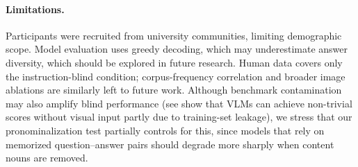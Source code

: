 \paragraph{Limitations.}
Participants were recruited from university communities, limiting demographic scope.
Model evaluation uses greedy decoding, which may underestimate answer diversity, which should be explored in future research.
Human data covers only the instruction-blind condition; corpus-frequency correlation
\citep{mccoy2024embers} and broader image ablations are similarly left to future work.
Although benchmark contamination may also amplify blind performance (see \citet{chen2024are} show that VLMs can achieve non-trivial scores without visual input partly due to training-set leakage), we stress that our pronominalization test partially controls for this, since models that rely on memorized question--answer pairs should degrade more sharply when content nouns are removed.



